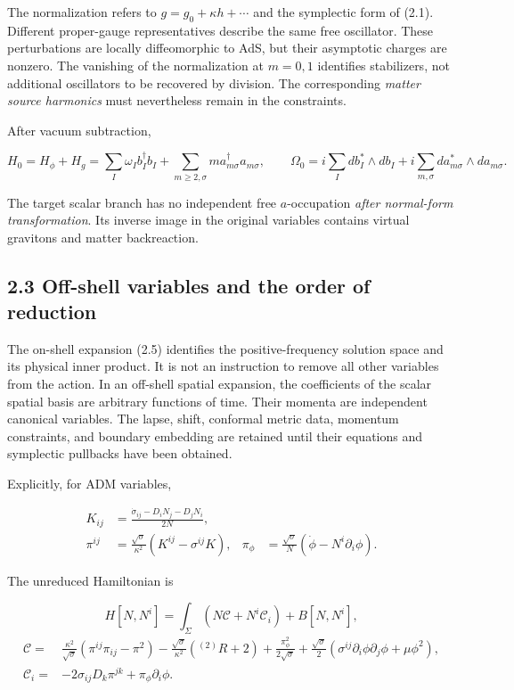 The normalization refers to \(g=g_0+\kappa h+\cdots\) and the symplectic form of (2.1). Different proper-gauge representatives describe the same free oscillator. These perturbations are locally diffeomorphic to AdS, but their asymptotic charges are nonzero. The vanishing of the normalization at \(m=0,1\) identifies stabilizers, not additional oscillators to be recovered by division. The corresponding \emph{matter source harmonics} must nevertheless remain in the constraints.

After vacuum subtraction,

\[
H_0=H_\phi+H_g
=\sum_I\omega_I b_I^\dagger b_I
+\sum_{m\ge2,\sigma}m a_{m\sigma}^\dagger a_{m\sigma},
\qquad
\Omega_0=i\sum_I db_I^*\wedge db_I
+i\sum_{m,\sigma}da_{m\sigma}^*\wedge da_{m\sigma}.
\tag{2.9}
\]

The target scalar branch has no independent free \(a\)-occupation \emph{after normal-form transformation}. Its inverse image in the original variables contains virtual gravitons and matter backreaction.

\hypertarget{off-shell-variables-and-the-order-of-reduction}{%
\subsection{2.3 Off-shell variables and the order of reduction}\label{off-shell-variables-and-the-order-of-reduction}}

The on-shell expansion (2.5) identifies the positive-frequency solution space and its physical inner product. It is not an instruction to remove all other variables from the action. In an off-shell spatial expansion, the coefficients of the scalar spatial basis are arbitrary functions of time. Their momenta are independent canonical variables. The lapse, shift, conformal metric data, momentum constraints, and boundary embedding are retained until their equations and symplectic pullbacks have been obtained.

Explicitly, for ADM variables,

\[
\begin{aligned}
K_{ij}&=\frac{\dot\sigma_{ij}-D_iN_j-D_jN_i}{2N},\\
\pi^{ij}&=\frac{\sqrt\sigma}{\kappa^2}(K^{ij}-\sigma^{ij}K),
&
\pi_\phi&=\frac{\sqrt\sigma}{N}(\dot\phi-N^i\partial_i\phi).
\end{aligned}
\tag{2.10}
\]

The unreduced Hamiltonian is

\[
H[N,N^i]=\int_\Sigma(N\mathcal C+N^i\mathcal C_i)+B[N,N^i],
\tag{2.11}
\] \[
\begin{aligned}
\mathcal C={}&
\frac{\kappa^2}{\sqrt\sigma}
(\pi^{ij}\pi_{ij}-\pi^2)
-\frac{\sqrt\sigma}{\kappa^2}({}^{(2)}R+2)
+\frac{\pi_\phi^2}{2\sqrt\sigma}
+\frac{\sqrt\sigma}{2}
(\sigma^{ij}\partial_i\phi\partial_j\phi+\mu\phi^2),\\
\mathcal C_i={}&-2\sigma_{ij}D_k\pi^{jk}+\pi_\phi\partial_i\phi .
\end{aligned}
\tag{2.12}
\]

